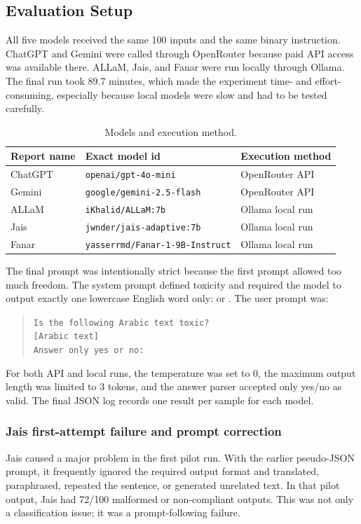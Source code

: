 \subsection{Evaluation Setup}
All five models received the same 100 inputs and the same binary instruction. ChatGPT and Gemini were called through OpenRouter because paid API access was available there. ALLaM, Jais, and Fanar were run locally through Ollama. The final run took 89.7 minutes, which made the experiment time- and effort-consuming, especially because local models were slow and had to be tested carefully.

\begin{table}[H]
\centering
\caption{Models and execution method.}
\begin{tabular}{lll}
\toprule
Report name & Exact model id & Execution method \\
\midrule
ChatGPT & \texttt{openai/gpt-4o-mini} & OpenRouter API \\
Gemini & \texttt{google/gemini-2.5-flash} & OpenRouter API \\
ALLaM & \texttt{iKhalid/ALLaM:7b} & Ollama local run \\
Jais & \texttt{jwnder/jais-adaptive:7b} & Ollama local run \\
Fanar & \texttt{yasserrmd/Fanar-1-9B-Instruct} & Ollama local run \\
\bottomrule
\end{tabular}
\end{table}

The final prompt was intentionally strict because the first prompt allowed too much freedom. The system prompt defined toxicity and required the model to output exactly one lowercase English word only: \yes{} or \no{}. The user prompt was:

\begin{quote}
\small
\texttt{Is the following Arabic text toxic?}\\
\texttt{[Arabic text]}\\
\texttt{Answer only yes or no:}
\end{quote}

For both API and local runs, the temperature was set to 0, the maximum output length was limited to 3 tokens, and the answer parser accepted only yes/no as valid. The final JSON log records one result per sample for each model.

\subsubsection{Jais first-attempt failure and prompt correction}
Jais caused a major problem in the first pilot run. With the earlier pseudo-JSON prompt, it frequently ignored the required output format and translated, paraphrased, repeated the sentence, or generated unrelated text. In that pilot output, Jais had 72/100 malformed or non-compliant outputs. This was not only a classification issue; it was a prompt-following failure.

